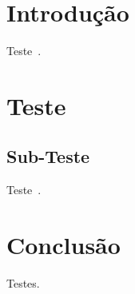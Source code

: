 \section{Introdução}

    Teste~\cite{ARA, ARC, A21, PESH, SBL}.



\section{Teste}

    \subsection{Sub-Teste}

    Teste~\cite{ARA}.



\section{Conclusão}

    Testes.


